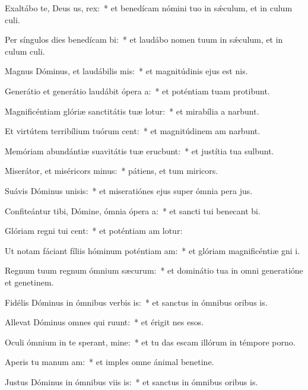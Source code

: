 \item Exaltábo te, Deus us, rex:~* et benedícam nómini tuo in sǽculum, et in culum culi.
\item Per síngulos dies benedícam bi:~* et laudábo nomen tuum in sǽculum, et in culum culi.
\item Magnus Dóminus, et laudábilis mis:~* et magnitúdinis ejus  est nis.
\item Generátio et generátio laudábit ópera a:~* et poténtiam tuam protibunt.
\item Magnificéntiam glóriæ sanctitátis tuæ lotur:~* et mirabília a narbunt.
\item Et virtútem terribílium tuórum cent:~* et magnitúdinem am narbunt.
\item Memóriam abundántiæ suavitátis tuæ erucbunt:~* et justítia tua sulbunt.
\item Miserátor, et miséricors minus:~* pátiens, et tum miricors.
\item Suávis Dóminus unisis:~* et miseratiónes ejus super ómnia pera jus.
\item Confiteántur tibi, Dómine, ómnia ópera a:~* et sancti tui benecant bi.
\item Glóriam regni tui cent:~* et poténtiam am lotur:
\item Ut notam fáciant fíliis hóminum poténtiam am:~* et glóriam magnificéntiæ gni i.
\item Regnum tuum regnum ómnium sæcurum:~* et dominátio tua in omni generatióne et genetinem.
\item Fidélis Dóminus in ómnibus verbis is:~* et sanctus in ómnibus oribus is.
\item Allevat Dóminus omnes qui ruunt:~* et érigit nes esos.
\item Oculi ómnium in te sperant, mine:~* et tu das escam illórum in témpore porno.
\item Aperis tu manum am:~* et imples omne ánimal benetine.
\item Justus Dóminus in ómnibus viis is:~* et sanctus in ómnibus oribus is.
